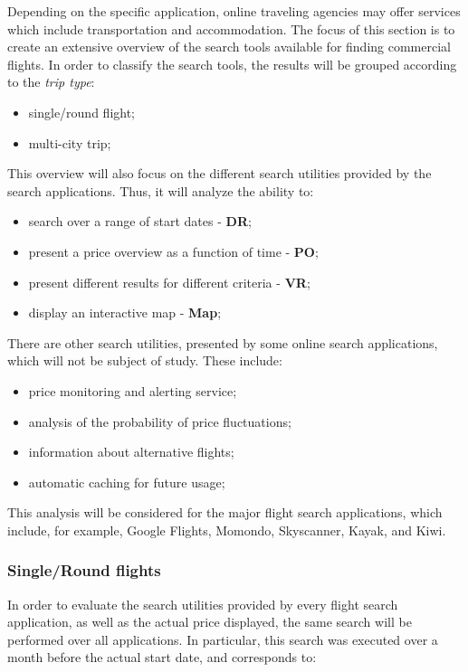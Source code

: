 Depending on the specific application, online traveling agencies may offer services which
include transportation and accommodation. The focus of this section is to create an extensive
overview of the search tools available for finding commercial flights. 
In order to classify the search tools, the results will be grouped 
according to the \textit{trip type}:

\begin{itemize}
  \item single/round flight;
  \item multi-city trip;
\end{itemize}

This overview will also focus on the different search utilities provided 
by the search applications. Thus, it will analyze the ability to:

\begin{itemize}
  \item search over a range of start dates - \textbf{DR};
  \item present a price overview as a function of time - \textbf{PO};
  \item present different results for different criteria - \textbf{VR};
  \item display an interactive map - \textbf{Map};
\end{itemize}

There are other search utilities, presented by some online search applications,
which will not be subject of study. These include:

\begin{itemize}
  \item price monitoring and alerting service;
  \item analysis of the probability of price fluctuations;
  \item information about alternative flights;
  \item automatic caching for future usage;
\end{itemize}

This analysis will be considered for the major flight search applications,
which include, for example, Google Flights, Momondo, Skyscanner, Kayak, and Kiwi.



\subsubsection*{Single/Round flights}


In order to evaluate the search utilities provided by every flight search application,
as well as the actual price displayed, the same search will be performed over 
all applications. In particular, this search was executed over a month before the 
actual start date, and corresponds to:

